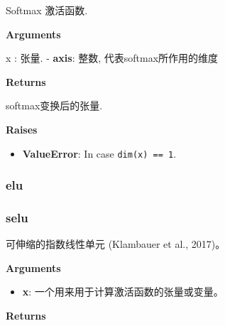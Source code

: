 \begin{Shaded}
\begin{Highlighting}[]
\OperatorTok{=-}\NormalTok{)}
\end{Highlighting}
\end{Shaded}

Softmax 激活函数.

\textbf{Arguments}

x : 张量. - \textbf{axis}: 整数, 代表softmax所作用的维度

\textbf{Returns}

softmax变换后的张量.

\textbf{Raises}

\begin{itemize}
\tightlist
\item
  \textbf{ValueError}: In case \texttt{dim(x)\ ==\ 1}.
\end{itemize}



\subsubsection{elu}\label{elu}

\begin{Shaded}
\begin{Highlighting}[]
\OperatorTok{=}\NormalTok{)}
\end{Highlighting}
\end{Shaded}



\subsubsection{selu}\label{selu}

\begin{Shaded}
\begin{Highlighting}[]
\end{Highlighting}
\end{Shaded}

可伸缩的指数线性单元 (Klambauer et al., 2017)。

\textbf{Arguments}

\begin{itemize}
\tightlist
\item
  \textbf{x}: 一个用来用于计算激活函数的张量或变量。
\end{itemize}

\textbf{Returns}

